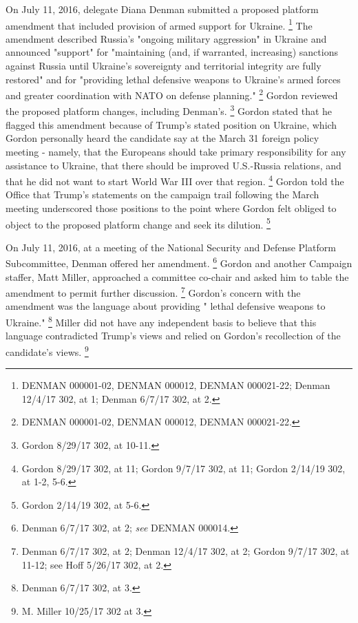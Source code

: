 On July 11, 2016, delegate Diana Denman submitted a proposed platform amendment that included provision of armed support for Ukraine.%
\footnote{DENMAN 000001-02, DENMAN 000012, DENMAN 000021-22;
Denman 12/4/17 302, at 1;
Denman 6/7/17 302, at 2.}
The amendment described Russia's "ongoing military aggression" in Ukraine and announced "support" for "maintaining (and, if warranted, increasing) sanctions against Russia until Ukraine's sovereignty and territorial integrity are fully restored" and for "providing lethal defensive weapons to Ukraine's armed forces and greater coordination with NATO on defense planning."%
\footnote{DENMAN 000001-02, DENMAN 000012, DENMAN 000021-22.}
Gordon reviewed the proposed platform changes, including Denman's.%
\footnote{Gordon 8/29/17 302, at 10-11.}
Gordon stated that he flagged this amendment because of Trump's stated position on Ukraine, which Gordon personally heard the candidate say at the March 31 foreign policy meeting - namely, that the Europeans should take primary responsibility for any assistance to Ukraine, that there should be improved U.S.-Russia relations, and that he did not want to start World War III over that region.%
\footnote{Gordon 8/29/17 302, at 11;
Gordon 9/7/17 302, at 11;
Gordon 2/14/19 302, at 1-2, 5-6.}
Gordon told the Office that Trump's statements on the campaign trail following the March meeting underscored those positions to the point where Gordon felt obliged to object to the proposed platform change and seek its dilution.%
\footnote{Gordon 2/14/19 302, at 5-6.}

On July 11, 2016, at a meeting of the National Security and Defense Platform Subcommittee, Denman offered her amendment.%
\footnote{Denman 6/7/17 302, at 2;
\textit{see} DENMAN 000014.}
Gordon and another Campaign staffer, Matt Miller, approached a committee co-chair and asked him to table the amendment to permit further discussion.%
\footnote{Denman 6/7/17 302, at 2;
Denman 12/4/17 302, at 2;
Gordon 9/7/17 302, at 11-12;
see Hoff 5/26/17 302, at 2.}
Gordon's concern with the amendment was the language about providing " lethal defensive weapons to Ukraine."%
\footnote{Denman 6/7/17 302, at 3.}
Miller did not have any independent basis to believe that this language contradicted Trump's views and relied on Gordon's recollection of the candidate's views.%
\footnote{M. Miller 10/25/17 302 at 3.}

